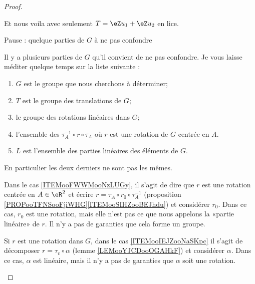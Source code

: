\begin{proof}
\begin{subproof}
\begin{subproof}
            \end{subproof}
    \end{subproof}

    Et nous voila avec seulement \( T=\eZ u_1+\eZ u_2\) en lice.

    \begin{subproof}
        \item[Pause : quelque parties de \( G\) à ne pas confondre]

            Il y a plusieurs parties de \( G\) qu'il convient de ne pas confondre. Je vous laisse méditer quelque temps sur la liste suivante :
            \begin{enumerate}
                \item \( G\) est le groupe que nous cherchons à déterminer;
                \item \( T\) est le groupe des translations de \( G\);
                \item le groupe des rotations linéaires dans \( G\);
                \item l'ensemble des \( \tau_A^{-1}\circ r\circ\tau_A\) où \( r\) est une rotation de \( G\) centrée en \( A\).     \label{ITEMooFWWMooNzLUGy}
                \item \( L\) est l'ensemble des parties linéaires des éléments de \( G\).      \label{ITEMooIEJZooNaSKpc}
            \end{enumerate}
            En particulier les deux derniers ne sont pas les mêmes. 

            Dans le cas \ref{ITEMooFWWMooNzLUGy}, il s'agit de dire que \( r\) est une rotation centrée en \( A\in \eR^2\) et écrire \( r=\tau_A\circ r_0\circ \tau_A^{-1}\) (proposition \ref{PROPooTFNSooFjiWHG}\ref{ITEMooSIHZooBEJhdu}) et considérer \( r_0\). Dans ce cas, \( r_0\) est une rotation, mais elle n'est pas ce que nous appelons la «partie linéaire» de \( r\). Il n'y a pas de garanties que cela forme un groupe.
            
            Si \( r\) est une rotation dans \( G\), dans le cas \ref{ITEMooIEJZooNaSKpc} il s'agit de décomposer \( r=\tau_v\circ\alpha\) (lemme \ref{LEMooYJCDooOGAHkF}) et considérer \( \alpha\). Dans ce cas, \( \alpha\) est linéaire, mais il n'y a pas de garanties que \( \alpha\) soit une rotation. 
            

\end{subproof}
\end{proof}
